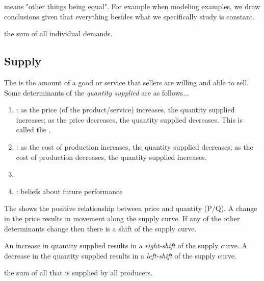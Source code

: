 \documentclass{article}
\begin{document}
\begin{definition}
   means "other things being equal". For example when modeling examples, we draw conclusions given that everything besides what we specifically study is constant. 
\end{definition}

\begin{definition}
  the sum of all individual demands. 
\end{definition}

\subsection{Supply}

The  is the amount of a good or service that sellers are willing and able to sell. Some determinants of the \emph{quantity supplied} are as follows$\dots$

\begin{enumerate}
  \item {}: as the price (of the product/service) increases, the quantity supplied increases; as the price decreases, the quantity supplied decreases. This is called the . 
  \item {}: as the cost of production increases, the quantity supplied decreases; as the cost of production decreases, the quantity supplied increases. 
  \item {}
  \item {}: beliefs about future performance
\end{enumerate}

The  shows the positive relationship between price and quantity (P/Q). A change in the price results in movement along the supply curve. If any of the other determinants change then there is a shift of the supply curve. \\ 

\begin{remark}
  An increase in quantity supplied results in a \emph{right-shift} of the supply curve. A decrease in the quantity supplied results in a \emph{left-shift} of the supply curve. 
\end{remark}

\begin{definition}
  the sum of all that is supplied by all producers.
\end{definition}
\end{document}
